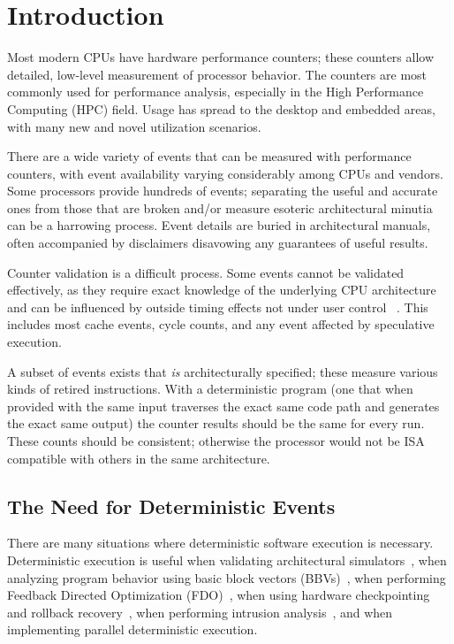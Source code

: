\section{Introduction}

Most modern CPUs have hardware performance counters; these
counters allow detailed, low-level measurement of processor behavior.
The counters are most commonly used for performance analysis, especially
in the High Performance Computing (HPC) field.  Usage has spread
to the desktop and embedded areas, with many new and novel
utilization scenarios.

There are a wide variety of events that can be measured with performance
counters, with event availability varying considerably among CPUs and vendors.
Some processors provide hundreds of events; separating the
useful and accurate ones from those that are broken and/or measure
esoteric architectural minutia can be a harrowing process.
Event details are buried in architectural manuals, often accompanied
by disclaimers disavowing any guarantees of useful results.

Counter validation is a difficult process.  Some events cannot
be validated effectively, as they require exact knowledge of
the underlying CPU architecture and can be influenced
by outside timing effects not under user control
~\cite{mytkowicz+:asplos09}.
This includes most cache events, cycle counts, and any event
affected by speculative execution. 

A subset of events exists that {\em is} architecturally specified;
these measure various kinds of retired instructions.
With a deterministic program (one that when provided
with the same input traverses the exact same code path
and generates the exact same output)
the counter results should be the same for every run.
These counts should be consistent; otherwise
the processor would not be ISA compatible with others in
the same architecture.

\subsection{The Need for Deterministic Events}

There are many situations where deterministic software execution
is necessary.  
Deterministic execution is useful when validating 
architectural simulators~\cite{weaver+:wddd08,desikan+:trut01},
when analyzing program behavior using 
basic block vectors (BBVs)~\cite{weaver+:hipeac08},
when performing Feedback Directed Optimization (FDO)~\cite{chen+:cgo10},
when using hardware checkpointing and 
rollback recovery~\cite{stodden+:isas06}, 
when performing intrusion analysis~\cite{dunlap+:osdi02},
and when implementing parallel deterministic 
execution.

